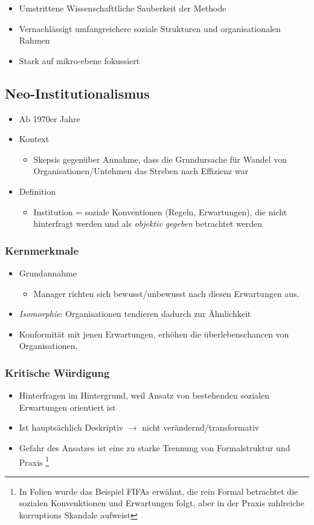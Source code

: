 \begin{itemize}
    \item Umstrittene Wissenschafttliche Sauberkeit der Methode
    \item Vernachlässigt umfangreichere soziale Strukturen und organisationalen Rahmen
    \item Stark auf mikro-ebene fokussiert
\end{itemize}
\pagebreak
\subsection{Neo-Institutionalismus}
\begin{itemize}
    \item Ab 1970er Jahre
    \item Kontext
    \begin{itemize}
        \item Skepsis gegenüber Annahme, dass die Grundursache für Wandel von Organisationen/Untehmen das Streben nach Effizienz war
    \end{itemize}
    \item Definition
    \begin{itemize}
        \item  Institution = soziale Konventionen (Regeln, Erwartungen), die nicht hinterfragt werden und als \textit{objektiv gegeben} betrachtet werden
    \end{itemize} 
\end{itemize}
\subsubsection{Kernmerkmale}
\begin{itemize}
    \item Grundannahme
    \begin{itemize}
        \item Manager richten sich bewusst/unbewusst nach diesen Erwartungen aus.  
    \end{itemize}
    \item \textit{Isomorphie}: Organisationen tendieren dadurch zur Ähnlichkeit 
    \item Konformität mit jenen Erwartungen, erhöhen die überlebenschancen von Organisationen.
\end{itemize}

\subsubsection{Kritische Würdigung}
\begin{itemize}
    \item Hinterfragen im Hintergrund, weil Ansatz von bestehenden sozialen Erwartungen orientiert ist
    \item Ist hauptsächlich Deskriptiv $\rightarrow$ nicht verändernd/transformativ 
    \item Gefahr des Ansatzes ist eine zu starke Trennung von Formalstruktur und Praxis \footnote{In Folien wurde das Beispiel FIFAs erwähnt, die rein Formal betrachtet die sozialen Konvenktionen und Erwartungen folgt, aber in der Praxis zahlreiche korruptions Skandale aufweist} 
\end{itemize}
